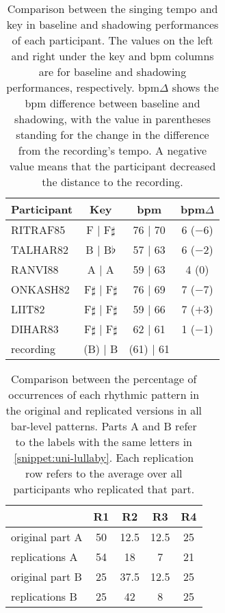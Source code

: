\begin{table}
	\caption[Key and \acs{bpm} deviation summary]
			{Comparison between the singing tempo and key in baseline and shadowing performances of each participant.
			The values on the left and right under the key and \acs{bpm} columns are for baseline and shadowing performances, respectively.
			\acs{bpm}$\Delta$ shows the \acs{bpm} difference between baseline and shadowing, with the value in parentheses standing for the change in the difference from the recording's tempo.
			A negative value means that the participant decreased the distance to the recording.}
	\label{tab:bpm_and_keys}
	\centering
	\begin{tabularx}{\linewidth}{Xccc}
		\toprule
		\bfseries{Participant}	& \bfseries{Key}			& \bfseries{\acs{bpm}}		& \bfseries{\acs{bpm}$\Delta$}	\\
		\midrule
		RITRAF85				& F  |  F$\sharp$			& 76  |  70					&  6 ($-$6)						\\
		TALHAR82				& B  |  B$\flat$			& 57  |  63					&  6 ($-$2)						\\
		RANVI88					& A  |  A					& 59  |  63					&  4 (\phantom{$-$}0)			\\
		ONKASH82				& F$\sharp$  |  F$\sharp$	& 76  |  69					&  7 ($-$7)						\\
		LIIT82					& F$\sharp$  |  F$\sharp$	& 59  |  66					&  7 ($+$3)						\\
		DIHAR83					& F$\sharp$  |  F$\sharp$	& 62  |  61					&  1 ($-$1)						\\
		\rule{0pt}{0.5cm}%
		recording				& (B) | B					& (61) | 61					&								\\
		\bottomrule
	\end{tabularx}
\end{table}
%
\begin{table}[b]
	\caption[Percentages of rhythmic pattern replications]
		{Comparison between the percentage of occurrences of each rhythmic pattern in the original and replicated versions in all bar-level patterns.
		Parts A and B refer to the labels with the same letters in \cref{snippet:uni-lullaby}.
		Each replication row refers to the average over all participants who replicated that part.}
	\label{tab:neutral_rhythm_key}
	\centering
	\begin{tabularx}{\linewidth}{XSSSS}
		\toprule
						& \bfseries{R1}		& \bfseries{R2}		& \bfseries{R3}		& \bfseries{R4}\\
		\midrule
		original part A	& 50				& 12.5				& 12.5				& 25\\
		replications A	& 54				& 18				& 7					& 21\\
		\rule{0pt}{0.5cm}%
		original part B	& 25				& 37.5				& 12.5				& 25\\
		replications B	& 25				& 42				& 8					& 25\\		
		\bottomrule
	\end{tabularx}
\end{table}
